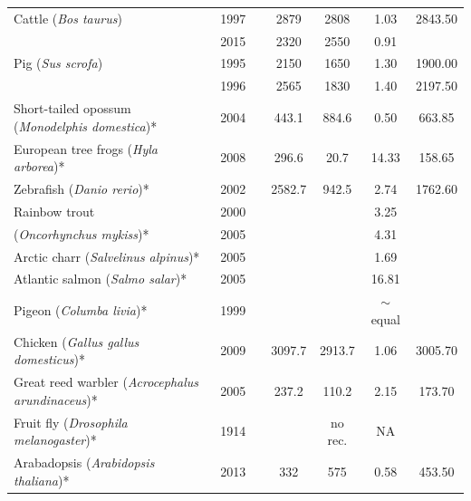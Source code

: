 {\begin{table}[p]
\begin{tabular}{|P{3.2cm}|c|c|c|c|c|c|}
\rule{0pt}{2ex} Cattle (\textit{Bos taurus}) & 1997 & \citet{Kappes1997} & 2879 & 2808 & 1.03 & 2843.50 \\
        & 2015 & \citet{Ma2015} & 2320 & 2550 & 0.91 &  \\ \hline
\rule{0pt}{2ex} Pig (\textit{Sus scrofa}) & 1995 & \citet{Archibald1995} & 2150 & 1650 & 1.30 & 1900.00 \\
     & 1996 & \citet{Marklund1996} & 2565 & 1830 & 1.40 & 2197.50 \\ \hline
\rule{0pt}{2ex} Short-tailed opossum (\textit{Monodelphis domestica})* & 2004 & \citet{Samollow2004} & 443.1 & 884.6 & 0.50 & 663.85 \\ \hline
\rule{0pt}{2ex} European tree frogs (\textit{Hyla arborea})* & 2008 & \citet{Berset-Brandli2008} & 296.6 & 20.7 & 14.33 & 158.65 \\ \hline
\rule{0pt}{2ex} Zebrafish (\textit{Danio rerio})* & 2002 & \citet{Singer2002} & 2582.7 & 942.5 & 2.74 & 1762.60 \\ \hline
\rule{0pt}{2ex} Rainbow trout  & 2000 & \citet{Sakamoto2000} &  &  & 3.25 &  \\
(\textit{Oncorhynchus mykiss})* & 2005 & \citet{Danzmann2005} &  &  & 4.31 &  \\ \hline
\rule{0pt}{2ex} Arctic charr (\textit{Salvelinus alpinus})* & 2005 & \citet{Danzmann2005} &  &  & 1.69 &  \\ \hline
\rule{0pt}{2ex} Atlantic salmon (\textit{Salmo salar})* & 2005 & \citet{Danzmann2005} &  &  & 16.81 &  \\ \hline
\rule{0pt}{2ex} Pigeon (\textit{Columba livia})* & 1999 & \citet{Pigozzi1999} &  &  & $\sim$equal &  \\ \hline
\rule{0pt}{2ex} Chicken (\textit{Gallus gallus domesticus})* & 2009 & \citet{Groenen2009} & 3097.7 & 2913.7 & 1.06 & 3005.70 \\ \hline
\rule{0pt}{2ex} Great reed warbler (\textit{Acrocephalus arundinaceus})* & 2005 & \citet{Hansson2005} & 237.2 & 110.2 & 2.15 & 173.70 \\ \hline
\rule{0pt}{2ex} Fruit fly (\textit{Drosophila melanogaster})* & 1914 & \citet{Morgan1914} &  & no rec. & NA &  \\ \hline
\rule{0pt}{2ex} Arabadopsis (\textit{Arabidopsis thaliana})* & 2013 & \citet{Basu-Roy2013} & 332 & 575 & 0.58 & 453.50 \\
    \hline \end{tabular}
\end{table}
\clearpage}

